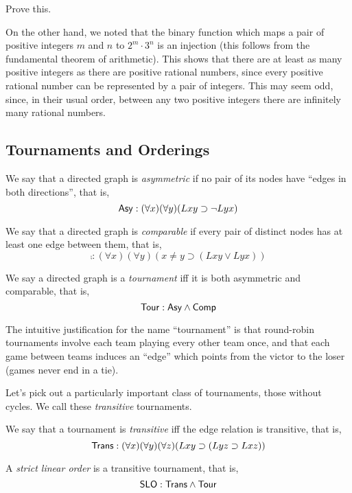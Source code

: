 \begin{aside}
    Prove this.
\end{aside}

On the other hand, we noted that the binary function which maps a pair of positive integers $m$ and $n$ to $2^m\cdot3^n$ is an injection (this follows from the fundamental theorem of arithmetic). This shows that there are at least as many positive integers as there are positive rational numbers, since every positive rational number can be represented by a pair of integers. This may seem odd, since, in their usual order, between any two positive integers there are infinitely many rational numbers. 


\subsection*{Tournaments and Orderings}


\begin{definition}
We say that a directed graph is \emph{asymmetric} if no pair of its nodes have ``edges in both directions'', that is,
\[
  \mbox{$\mathsf{Asy}$}: (\forall x)(\forall y)(Lxy\supset \neg Lyx)  
\]
\end{definition}

\begin{definition}
We say that a directed graph is \emph{comparable} if every pair of distinct nodes has at least one edge between them, that is,
\[
    \comp: (\forall x)(\forall y)(x\neq y\supset (Lxy\vee Lyx))
\]
\end{definition}

\begin{definition}
We say a directed graph is a \emph{tournament} iff it is both asymmetric and comparable, that is,
\[
    \mbox{$\mathsf{Tour}$}: \mbox{$\mathsf{Asy}$} \land \mbox{$\mathsf{Comp}$}
\]
\end{definition}
The intuitive justification for the name ``tournament'' is that round-robin tournaments involve each team playing every other team once, and that each game between teams  induces an ``edge'' which points from the victor to the loser (games never end in a tie). 

Let's pick out a particularly important class of tournaments, those without cycles. We call these \emph{transitive} tournaments. 

\begin{definition}
We say that a tournament is \emph{transitive} iff the edge relation is transitive, that is,
\[
    \mbox{$\mathsf{Trans}$}: (\forall x)(\forall y)(\forall z)(Lxy\supset(Lyz\supset Lxz))
\]
\end{definition}

\begin{definition}
A \emph{strict linear order} is a transitive tournament, that is,
\[
    \mbox{$\mathsf{SLO}$}: \mbox{$\mathsf{Trans}$} \land \mbox{$\mathsf{Tour}$}
\]
\end{definition}